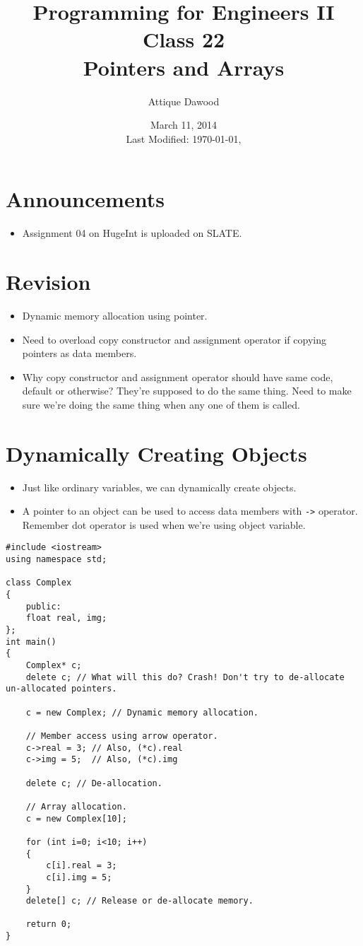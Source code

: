 \documentclass[12pt,a4paper]{article}
\title{\vspace{-2cm}Programming for Engineers II\\Class 22\\Pointers and Arrays}
\author{Attique Dawood}
\date{March 11, 2014\\[0.2cm] Last Modified: \today, \currenttime}
\begin{document}
\maketitle
\section{Announcements}
\begin{itemize}
\item Assignment 04 on HugeInt is uploaded on SLATE.
\end{itemize}
\section{Revision}
\begin{itemize}
\item Dynamic memory allocation using pointer.
\item Need to overload copy constructor and assignment operator if copying pointers as data members.
\item Why copy constructor and assignment operator should have same code, default or otherwise? They're supposed to do the same thing. Need to make sure we're doing the same thing when any one of them is called.
\end{itemize}
\section{Dynamically Creating Objects}
\begin{itemize}
\item Just like ordinary variables, we can dynamically create objects.
\item A pointer to an object can be used to access data members with \verb|->| operator. Remember dot operator is used when we're using object variable.
\end{itemize}
\begin{lstlisting}[caption={Pointers to Objects}]
#include <iostream>
using namespace std;

class Complex
{
	public:
	float real, img;
};
int main()
{
	Complex* c;
	delete c; // What will this do? Crash! Don't try to de-allocate un-allocated pointers.

	c = new Complex; // Dynamic memory allocation.

	// Member access using arrow operator.
	c->real = 3; // Also, (*c).real
	c->img = 5;  // Also, (*c).img

	delete c; // De-allocation.

	// Array allocation.
	c = new Complex[10];

	for (int i=0; i<10; i++)
	{
		c[i].real = 3;
		c[i].img = 5;
	}
	delete[] c; // Release or de-allocate memory.

	return 0;
}
\end{lstlisting}
\end{document}
